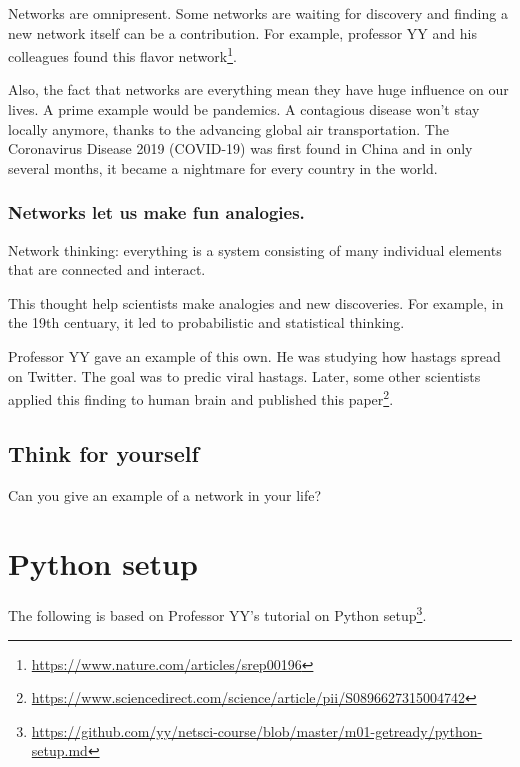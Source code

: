 \documentclass[
]{krantz}
\makeatletter
\renewcommand{\href}[2]{#2\footnote{\url{#1}}}
\newenvironment{kframe}{%
\medskip{}
\setlength{\fboxsep}{.8em}
 \def\at@end@of@kframe{}%
 \ifinner\ifhmode%
  \def\at@end@of@kframe{\end{minipage}}%
  \begin{minipage}{\columnwidth}%
 \fi\fi%
 \def\FrameCommand##1{\hskip\@totalleftmargin \hskip-\fboxsep
 \colorbox{shadecolor}{##1}\hskip-\fboxsep
     \hskip-\linewidth \hskip-\@totalleftmargin \hskip\columnwidth}%
 \MakeFramed {\advance\hsize-\width
   \@totalleftmargin\z@ \linewidth\hsize
   \@setminipage}}%
 {\par\unskip\endMakeFramed%
 \at@end@of@kframe}
\newenvironment{rmdblock}[1]
  {
  \begin{itemize}
  \renewcommand{\labelitemi}{
    \raisebox{-.7\height}[0pt][0pt]{
      {\setkeys{Gin}{width=3em,keepaspectratio}\texttt{[image: images/\#1]}}
    }
  }
  \setlength{\fboxsep}{1em}
  \begin{kframe}
  \item
  }
  {
  \end{kframe}
  \end{itemize}
  }
\newenvironment{rmdnote}
  {\begin{rmdblock}{note}}
  {\end{rmdblock}}
\makeatother
\begin{document}
Networks are omnipresent. Some networks are waiting for discovery and finding a new network itself can be a contribution. For example, professor YY and his colleagues found this \href{https://www.nature.com/articles/srep00196}{flavor network}.

Also, the fact that networks are everything mean they have huge influence on our lives. A prime example would be pandemics. A contagious disease won't stay locally anymore, thanks to the advancing global air transportation. The Coronavirus Disease 2019 (COVID-19) was first found in China and in only several months, it became a nightmare for every country in the world.

\hypertarget{networks-let-us-make-fun-analogies.}{%
\subsubsection{Networks let us make fun analogies.}\label{networks-let-us-make-fun-analogies.}}

Network thinking: everything is a system consisting of many individual elements that are connected and interact.

This thought help scientists make analogies and new discoveries. For example, in the 19th centuary, it led to probabilistic and statistical thinking.

Professor YY gave an example of this own. He was studying how hastags spread on Twitter. The goal was to predic viral hastags. Later, some other scientists applied this finding to human brain and published \href{https://www.sciencedirect.com/science/article/pii/S0896627315004742}{this paper}.

\hypertarget{think-for-yourself}{%
\subsection{Think for yourself}\label{think-for-yourself}}

Can you give an example of a network in your life?

\hypertarget{python-setup}{%
\section{Python setup}\label{python-setup}}

\begin{rmdnote}
The following is based on Professor YY's \href{https://github.com/yy/netsci-course/blob/master/m01-getready/python-setup.md}{tutorial on Python setup}.
\end{rmdnote}
\end{document}
